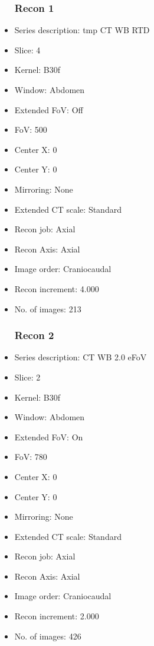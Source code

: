 \documentclass[12pt]{article}
\begin{document}
\begin{itemize}
\subsubsection{Recon 1}
\item Series description: tmp CT WB RTD
\item Slice: 4
\item Kernel: B30f
\item Window: Abdomen
\item Extended FoV: Off
\item FoV: 500
\item Center X: 0
\item Center Y: 0
\item Mirroring: None
\item Extended CT scale: Standard
\item Recon job: Axial
\item Recon Axis: Axial
\item Image order: Craniocaudal
\item Recon increment: 4.000
\item No. of images: 213
\subsubsection{Recon 2}
\item Series description: CT WB 2.0 eFoV
\item Slice: 2
\item Kernel: B30f
\item Window: Abdomen
\item Extended FoV: On
\item FoV: 780
\item Center X: 0
\item Center Y: 0
\item Mirroring: None
\item Extended CT scale: Standard
\item Recon job: Axial
\item Recon Axis: Axial
\item Image order: Craniocaudal
\item Recon increment: 2.000
\item No. of images: 426

\end{itemize}
\end{document}

